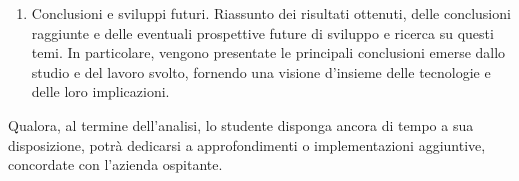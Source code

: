\begin{enumerate}
    \item Conclusioni e sviluppi futuri.
    Riassunto dei risultati ottenuti, delle conclusioni raggiunte e delle eventuali prospettive future di sviluppo e ricerca su questi temi.
    In particolare, vengono presentate le principali conclusioni emerse dallo studio e del lavoro svolto, fornendo una visione d'insieme delle tecnologie e delle loro implicazioni.

\end{enumerate}

Qualora, al termine dell'analisi, lo studente disponga ancora di tempo a sua disposizione, potrà dedicarsi a approfondimenti o implementazioni aggiuntive, concordate con l'azienda ospitante.